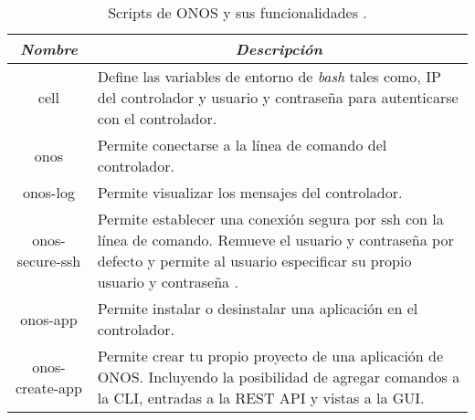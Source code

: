 \begin{table}[th]
	\centering
	\begin{tabular}{| c | m{11cm} |}
		\hline		
		{\cellcolor[HTML]{C0C0C0}}\textbf{\textit{Nombre}} & \multicolumn{1}{c}{{\cellcolor[HTML]{C0C0C0}}\textbf{\textit{Descripción}}}                                                     \\
		\hline\hline		
		cell                     						   & Define las variables de entorno de \textit{bash} tales como, IP del controlador y usuario y contraseña para autenticarse con el controlador.                                                   \\
		\hline		
		{\cellcolor[HTML]{C0C0C0}}onos                     & {\cellcolor[HTML]{C0C0C0}}Permite conectarse a la línea de comando del controlador.                                                                                                                             \\
		\hline		
		onos-log                 						   & Permite visualizar los mensajes del controlador.                                                                                                                             \\
		\hline		
		{\cellcolor[HTML]{C0C0C0}}onos-secure-ssh          & {\cellcolor[HTML]{C0C0C0}}Permite establecer una conexión segura por ssh con la línea de comando. Remueve el usuario y contraseña por defecto y permite al usuario especificar su propio usuario y contraseña \parencite{onos-secure-ssh}. \\
		\hline		
		onos-app                                           & Permite instalar o desinstalar una aplicación en el controlador.                                                                                                                      \\
		\hline		
		{\cellcolor[HTML]{C0C0C0}}onos-create-app          & {\cellcolor[HTML]{C0C0C0}}Permite crear tu propio proyecto de una aplicación de ONOS. Incluyendo la posibilidad de agregar comandos a la CLI, entradas a la REST API y vistas a la GUI. \\                                         
		\hline		
	\end{tabular}
	\caption[Scripts de ONOS y sus funcionalidades]{Scripts de ONOS y sus funcionalidades \parencite{onosscripts}.}
	\label{table:onos-scripts}
\end{table}
